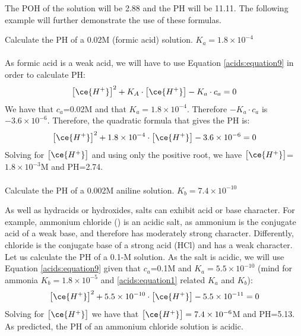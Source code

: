 \documentclass[main.tex]{subfiles}
\newcommand\chapterlabel{acids}
\begin{document}
\begin{description}
The POH of the solution will be 2.88 and the PH will be 11.11. The following example will further demonstrate the use of these formulas.
\begin{example} %
Calculate the PH of a 0.02M   (formic acid) solution. $K_a=1.8 \times 10^{-4}$
\\
\\
As formic acid is a weak acid, we will have to use Equation \ref{\chapterlabel:equation9} in order to calculate PH:
\[\big[ \ce{H^+} \big]^2 +K_A\cdot \big[ \ce{H^+} \big] -K_a\cdot c_a=0\]
We have that $c_a$=0.02M and that $K_a=1.8 \times 10^{-4}$. Therefore $-K_a\cdot c_a$ is $-3.6 \times 10^{-6}$. Therefore, the quadratic formula that gives the PH is:
\[\big[ \ce{H^+} \big]^2 +1.8 \times 10^{-4}\cdot \big[ \ce{H^+} \big] -3.6 \times 10^{-6}=0\]
Solving for $\big[ \ce{H^+} \big]$ and using only the positive root, we have $\big[ \ce{H^+} \big]$=$1.8\times 10^{-3}$M and PH=2.74.
\\
\faDiamond\ \\
Calculate the PH of a 0.002M  aniline solution. $K_b=7.4 \times 10^{-10}$
\end{example}%

\item[\docfilehook{\smallpencil PH of salt solutions}{PH of salt solutions}] As well as hydracids or hydroxides, salts can exhibit acid or base character. For example, ammonium chloride () is an acidic salt, as ammonium is the conjugate acid of a weak base, and therefore has moderately strong character. Differently, chloride is the conjugate base of a strong acid (HCl) and has a weak character. Let us calculate the PH of a 0.1-M  solution. As the salt is acidic, we will use Equation \ref{\chapterlabel:equation9} given that $c_a$=0.1M and $K_a=5.5\times 10^{-10}$ (mind for ammonia $K_b=1.8\times 10^{-5}$ and \ref{\chapterlabel:equation1} related $K_a$ and $K_b$):
\[ \big[ \ce{H^+} \big]^2 +5.5 \times 10^{-10}\cdot \big[ \ce{H^+} \big] -5.5 \times 10^{-11}=0 \]
Solving for $\big[ \ce{H^+} \big]$ we have that $\big[ \ce{H^+} \big]=7.4\times 10^{-6}$M and PH=5.13. As predicted, the PH of an ammonium chloride solution is acidic.


\end{description}
\end{document}
